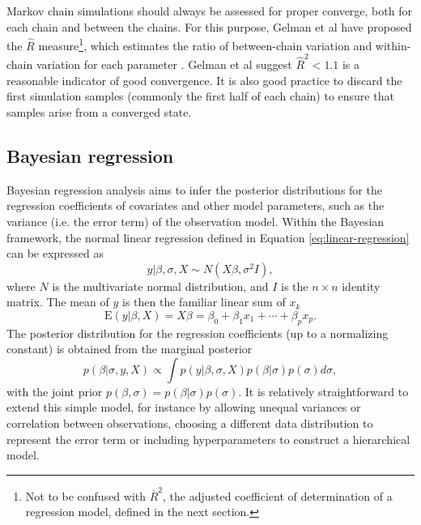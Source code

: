 Markov chain simulations should always be assessed for proper converge, both
for each chain and between the chains. For this purpose, Gelman et al have
proposed the $\hat{R}$ measure\footnote{Not to be confused with $\bar{R}^2$,
the adjusted coefficient of determination of a regression model, defined in
the next section.}, which estimates the ratio of between-chain variation and
within-chain variation for each parameter \citep{Gelman2013}. Gelman et al
suggest $\hat{R}^2 < 1.1$ is a reasonable indicator of good convergence. It is
also good practice to discard the first simulation samples (commonly the first
half of each chain) to ensure that samples arise from a converged state.


\subsection{Bayesian regression}

Bayesian regression analysis aims to infer the posterior distributions
for the regression coefficients of covariates and other model parameters,
such as the variance (i.e. the error term) of the observation model.
Within the Bayesian framework, the normal linear regression defined in
Equation \eqref{eq:linear-regression} can be expressed as
\begin{equation}
  y | \beta, \sigma, X \sim N(X \beta, \sigma^2I),
  \label{eq:bayesian-linear-regression}
\end{equation}
where $N$ is the multivariate normal distribution, and $I$ is the $n \times n$
identity matrix. The mean of $y$ is then the familiar linear sum of $x_k$
\begin{equation}
  \textrm{E}(y|\beta,X) = X \beta = \beta_0 + \beta_1 x_1 + \dotsb + \beta_p x_p.
\end{equation}
The posterior distribution for the regression coefficients (up to a
normalizing constant) is obtained from the marginal posterior
\begin{equation}
  p(\beta | \sigma, y, X) \propto \int p(y | \beta, \sigma, X) p(\beta | \sigma) p(\sigma) d\sigma,
\end{equation}
with the joint prior $p(\beta, \sigma) = p(\beta | \sigma) p(\sigma)$.
It is relatively straightforward to extend this simple model, for instance by
allowing unequal variances or correlation between observations, choosing a
different data distribution
to represent the error term or including hyperparameters to construct a
hierarchical model.

